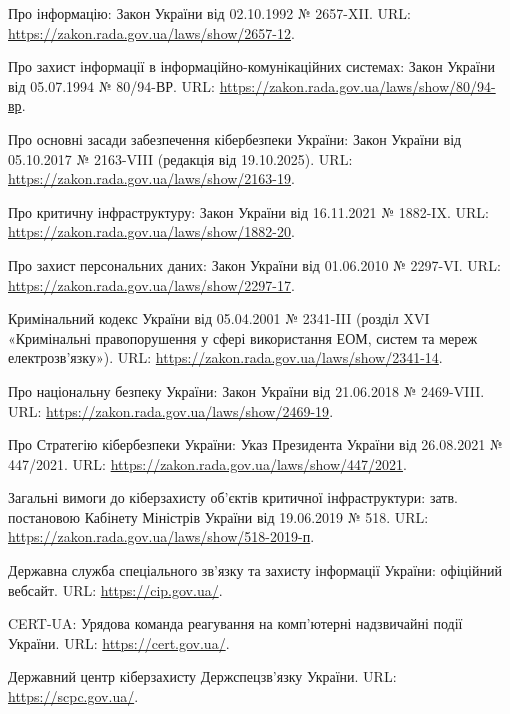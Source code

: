 
 Про інформацію: Закон України від 02.10.1992 № 2657-XII. URL: \url{https://zakon.rada.gov.ua/laws/show/2657-12}.

 Про захист інформації в інформаційно-комунікаційних системах: Закон України від 05.07.1994 № 80/94-ВР. URL: \url{https://zakon.rada.gov.ua/laws/show/80/94-вр}.

 Про основні засади забезпечення кібербезпеки України: Закон України від 05.10.2017 № 2163-VIII (редакція від 19.10.2025). URL: \url{https://zakon.rada.gov.ua/laws/show/2163-19}.

 Про критичну інфраструктуру: Закон України від 16.11.2021 № 1882-IX. URL: \url{https://zakon.rada.gov.ua/laws/show/1882-20}.

 Про захист персональних даних: Закон України від 01.06.2010 № 2297-VI. URL: \url{https://zakon.rada.gov.ua/laws/show/2297-17}.

 Кримінальний кодекс України від 05.04.2001 № 2341-III (розділ XVI «Кримінальні правопорушення у сфері використання ЕОМ, систем та мереж електрозв'язку»). URL: \url{https://zakon.rada.gov.ua/laws/show/2341-14}.

 Про національну безпеку України: Закон України від 21.06.2018 № 2469-VIII. URL: \url{https://zakon.rada.gov.ua/laws/show/2469-19}.

 Про Стратегію кібербезпеки України: Указ Президента України від 26.08.2021 № 447/2021. URL: \url{https://zakon.rada.gov.ua/laws/show/447/2021}.

 Загальні вимоги до кіберзахисту об'єктів критичної інфраструктури: затв. постановою Кабінету Міністрів України від 19.06.2019 № 518. URL: \url{https://zakon.rada.gov.ua/laws/show/518-2019-п}.

 Державна служба спеціального зв'язку та захисту інформації України: офіційний вебсайт. URL: \url{https://cip.gov.ua/}.

 CERT-UA: Урядова команда реагування на комп'ютерні надзвичайні події України. URL: \url{https://cert.gov.ua/}.

 Державний центр кіберзахисту Держспецзв'язку України. URL: \url{https://scpc.gov.ua/}.

